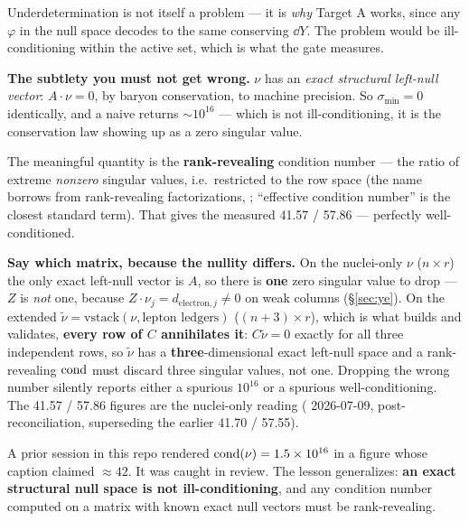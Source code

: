 Underdetermination is not itself a problem --- it is \emph{why} Target A works,
since any $\varphi$ in the null space decodes to the same conserving $\dd Y$.
The problem would be ill-conditioning within the active set, which is what the
gate measures.

\textbf{The subtlety you must not get wrong.} $\nu$ has an \emph{exact
structural left-null vector}: $A\cdot\nu = 0$, by baryon conservation, to
machine precision. So $\sigma_{\min} = 0$ identically, and a naive
 returns ${\sim}10^{16}$ --- which is not
ill-conditioning, it is the conservation law showing up as a zero singular
value.

The meaningful quantity is the \textbf{rank-revealing} condition number --- the
ratio of extreme \emph{nonzero} singular values, i.e.\ restricted to the row
space (the name borrows from rank-revealing factorizations,
\citealt{chan1987}; ``effective condition number'' is the closest standard
term). That gives the measured 41.57 / 57.86 --- perfectly well-conditioned.

\begin{warn}
\textbf{Say which matrix, because the nullity differs.} On the nuclei-only $\nu$
($n \times r$) the only exact left-null vector is $A$, so there is \textbf{one}
zero singular value to drop --- $Z$ is \emph{not} one, because
$Z\cdot\nu_j = d_{\mathrm{electron},j} \neq 0$ on weak columns
(\S\ref{sec:ye}). On the extended
$\tilde\nu = \mathrm{vstack}(\nu, \text{lepton ledgers})$
($(n+3) \times r$), which is what  builds and validates,
\textbf{every row of $C$ annihilates it}: $C\tilde\nu = 0$ exactly for all three
independent rows, so $\tilde\nu$ has a \textbf{three}-dimensional exact
left-null space and a rank-revealing $\operatorname{cond}$ must discard three singular values,
not one. Dropping the wrong number silently reports either a spurious $10^{16}$
or a spurious well-conditioning. The 41.57 / 57.86 figures are the nuclei-only
reading ( 2026-07-09, post-reconciliation, superseding the
earlier 41.70 / 57.55).
\end{warn}

\begin{aside}
A prior session in this repo rendered $\operatorname{cond}(\nu) = 1.5\times10^{16}$ in a
figure whose caption claimed $\approx 42$. It was caught in review. The lesson
generalizes: \textbf{an exact structural null space is not ill-conditioning},
and any condition number computed on a matrix with known exact null vectors must
be rank-revealing.
\end{aside}

